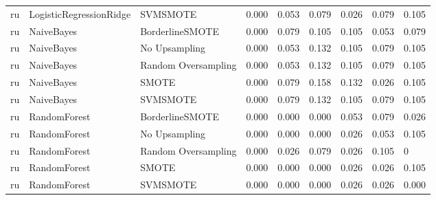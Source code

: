 \begin{tabular}{lllllllll}
      ru &      LogisticRegressionRidge &            SVMSMOTE & 0.000 &                     0.053 &                 0.079 &                  0.026 &                                   0.079 &     0.105 \\
      ru &                   NaiveBayes &     BorderlineSMOTE & 0.000 &                     0.079 &                 0.105 &                  0.105 &                                   0.053 &     0.079 \\
      ru &                   NaiveBayes &       No Upsampling & 0.000 &                     0.053 &                 0.132 &                  0.105 &                                   0.079 &     0.105 \\
      ru &                   NaiveBayes & Random Oversampling & 0.000 &                     0.053 &                 0.132 &                  0.105 &                                   0.079 &     0.105 \\
      ru &                   NaiveBayes &               SMOTE & 0.000 &                     0.079 &                 0.158 &                  0.132 &                                   0.026 &     0.105 \\
      ru &                   NaiveBayes &            SVMSMOTE & 0.000 &                     0.079 &                 0.132 &                  0.105 &                                   0.079 &     0.105 \\
      ru &                 RandomForest &     BorderlineSMOTE & 0.000 &                     0.000 &                 0.000 &                  0.053 &                                   0.079 &     0.026 \\
      ru &                 RandomForest &       No Upsampling & 0.000 &                     0.000 &                 0.000 &                  0.026 &                                   0.053 &     0.105 \\
      ru &                 RandomForest & Random Oversampling & 0.000 &                     0.026 &                 0.079 &                  0.026 &                                   0.105 &         0 \\
      ru &                 RandomForest &               SMOTE & 0.000 &                     0.000 &                 0.000 &                  0.026 &                                   0.026 &     0.105 \\
      ru &                 RandomForest &            SVMSMOTE & 0.000 &                     0.000 &                 0.000 &                  0.026 &                                   0.026 &     0.000 \\

\end{tabular}
